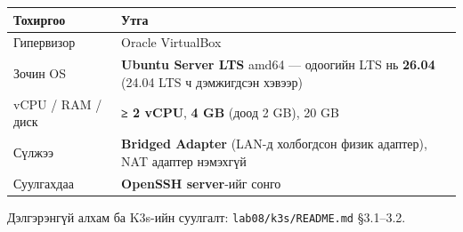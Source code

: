 \begingroup\scriptsize\begin{longtable}[]{@{}ll@{}}
\toprule
\begin{minipage}[b]{0.47\columnwidth}\raggedright
Тохиргоо\strut
\end{minipage} & \begin{minipage}[b]{0.47\columnwidth}\raggedright
Утга\strut
\end{minipage}\tabularnewline
\midrule
\endhead
\begin{minipage}[t]{0.47\columnwidth}\raggedright
Гипервизор\strut
\end{minipage} & \begin{minipage}[t]{0.47\columnwidth}\raggedright
Oracle VirtualBox\strut
\end{minipage}\tabularnewline
\begin{minipage}[t]{0.47\columnwidth}\raggedright
Зочин OS\strut
\end{minipage} & \begin{minipage}[t]{0.47\columnwidth}\raggedright
\textbf{Ubuntu Server LTS} amd64 --- одоогийн LTS нь \textbf{26.04} (24.04 LTS ч дэмжигдсэн хэвээр)\strut
\end{minipage}\tabularnewline
\begin{minipage}[t]{0.47\columnwidth}\raggedright
vCPU / RAM / диск\strut
\end{minipage} & \begin{minipage}[t]{0.47\columnwidth}\raggedright
\textbf{≥ 2 vCPU}, \textbf{4 GB} (доод 2 GB), 20 GB\strut
\end{minipage}\tabularnewline
\begin{minipage}[t]{0.47\columnwidth}\raggedright
Сүлжээ\strut
\end{minipage} & \begin{minipage}[t]{0.47\columnwidth}\raggedright
\textbf{Bridged Adapter} (LAN-д холбогдсон физик адаптер), NAT адаптер нэмэхгүй\strut
\end{minipage}\tabularnewline
\begin{minipage}[t]{0.47\columnwidth}\raggedright
Суулгахдаа\strut
\end{minipage} & \begin{minipage}[t]{0.47\columnwidth}\raggedright
\textbf{OpenSSH server}-ийг сонго\strut
\end{minipage}\tabularnewline
\bottomrule
\end{longtable}\endgroup

Дэлгэрэнгүй алхам ба K3s-ийн суулгалт: \texttt{lab08/\allowbreak{}k3s/\allowbreak{}README.\allowbreak{}md} §3.1--3.2.


